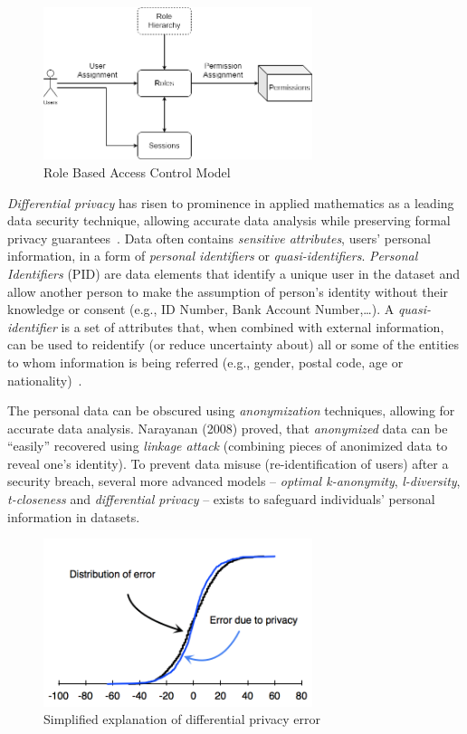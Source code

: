 \begin{figure}[htb]
    \centering
    \includegraphics[width=0.7\textwidth]{figures/rbacm.png}
    \caption{Role Based Access Control Model}
    \label{fig:rbacm}
\end{figure}
\FloatBarrier

\textit{Differential privacy} has risen to prominence in applied mathematics as a leading data security technique, allowing accurate data analysis while preserving formal privacy guarantees~\cite{cummings2018}.
Data often contains \textit{sensitive attributes}, users' personal information, in a form of \textit{personal identifiers} or \textit{quasi-identifiers}.
\textit{Personal Identifiers} (PID) are data elements that identify a unique user in the dataset and allow another person to make the assumption of person's identity without their knowledge or consent (e.g., ID Number, Bank Account Number,\ldots).
A \textit{quasi-identifier} is a set of attributes that, when combined with external information, can be used to reidentify (or reduce uncertainty about) all or some of the entities to whom information is being referred (e.g., gender, postal code, age or nationality)~\cite{qid-springer}.

The personal data can be obscured using \textit{anonymization} techniques, allowing for accurate data analysis.
Narayanan (2008) proved, that \textit{anonymized} data can be \enquote{easily} recovered using \textit{linkage attack} (combining pieces of anonimized data to reveal one's identity).
To prevent data misuse (re-identification of users) after a security breach, several more advanced models – \textit{optimal k-anonymity}, \textit{l-diversity}, \textit{t-closeness} and \textit{differential privacy} – exists to safeguard individuals' personal information in datasets.

\begin{figure}[htb]
    \centering
    \includegraphics[width=0.7\textwidth]{figures/cdf3.png}
    \caption{Simplified explanation of differential privacy error~\cite{difpriv2016}}
    \label{fig:cdf3}
\end{figure}
\FloatBarrier

